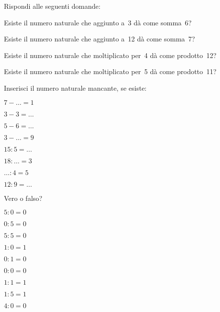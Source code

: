 \begin{esercizio}
Rispondi alle seguenti domande:
 \begin{enumeratea}
 \item Esiste il numero naturale che aggiunto a~3 dà come somma~6?
 \item Esiste il numero naturale che aggiunto a~12 dà come somma~7?
 \item Esiste il numero naturale che moltiplicato per~4 dà come prodotto~12?
 \item Esiste il numero naturale che moltiplicato per~5 dà come prodotto~11?
 \end{enumeratea}
\end{esercizio}

\begin{esercizio}
 Inserisci il numero naturale mancante, se esiste:
\begin{multicols}{4}
\begin{enumeratea}
 \item \(7-\ldots =1\)
 \item\(3-3=\ldots~\)
 \item\(5-6=\ldots~\)
 \item \(3-\ldots =9\)
 \item\(15:5=\ldots~\)
 \item\(18:\ldots =3\)
 \item \(\ldots:4=5\)
 \item\(12:9=\ldots~\)
\end{enumeratea}
\end{multicols}
\end{esercizio}

\begin{esercizio}
 Vero o falso?
\begin{multicols}{3}
\begin{enumeratea}
 \item \(5:0=0\)	\tab\boxV\quad\boxF
 \item \(0:5=0\)	\tab\boxV\quad\boxF
 \item \(5:5=0\)	\tab\boxV\quad\boxF
 \item \(1:0=1\)	\tab\boxV\quad\boxF
 \item \(0:1=0\)	\tab\boxV\quad\boxF
 \item \(0:0=0\)	\tab\boxV\quad\boxF
 \item \(1:1=1\)	\tab\boxV\quad\boxF
 \item \(1:5=1\)	\tab\boxV\quad\boxF
 \item \(4:0=0\)  \tab\boxV\quad\boxF
\end{enumeratea}
\end{multicols}
\end{esercizio}

